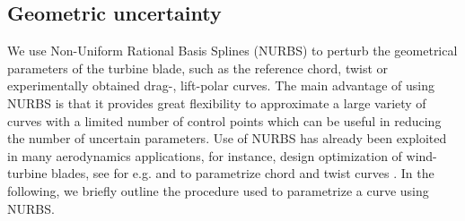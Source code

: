 \documentclass[review]{elsarticle}
\numberwithin{equation}{section}
\numberwithin{equation}{section}
\begin{document}
\subsection{Geometric uncertainty}
We use Non-Uniform Rational Basis Splines (NURBS) \cite{rogers2000} to perturb the geometrical parameters of the turbine blade, such as the reference chord, twist or experimentally obtained drag-, lift-polar curves. The main advantage of using NURBS is that it provides great flexibility to approximate a large variety of curves with a limited number of control points which can be useful in reducing the number of uncertain parameters. %
Use of NURBS has already been exploited in many aerodynamics applications, for instance, design optimization of wind-turbine blades, see for e.g. \cite{Bottasso2014,Ribeiro2012} and to parametrize chord and twist curves \cite{Echeverria2017}. In the following, we briefly outline the procedure used to parametrize a curve using NURBS.
\end{document}
